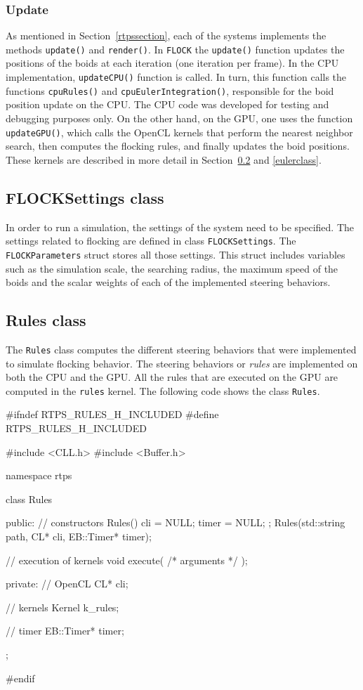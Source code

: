 \subsubsection{Update}
As mentioned in Section~\ref{rtpssection}, each of the systems implements the methods \texttt{update()} and \texttt{render()}. In \texttt{FLOCK} the \texttt{update()} function updates the positions of the boids at each iteration (one iteration per frame). In the CPU implementation, \texttt{updateCPU()} function is called. In turn, this function calls the functions \texttt{cpuRules()} and \texttt{cpuEulerIntegration()}, responsible for the boid position update on the CPU. The CPU code was developed for testing and debugging purposes only. On the other hand, on the GPU, one uses the function \texttt{updateGPU()}, which calls the OpenCL kernels that perform the nearest neighbor search, then computes the flocking rules, and finally updates the boid positions. These kernels are described in more detail in Section~\ref{rulesclass} and \ref{eulerclass}.

\subsection{FLOCKSettings class}
In order to run a simulation, the settings of the system need to be specified. The settings related to flocking are defined in class \texttt{FLOCKSettings}. The \texttt{FLOCKParameters} struct stores all those settings. This struct includes variables such as the simulation scale, the searching radius, the maximum speed of the boids and the scalar weights of each of the implemented steering behaviors. 

\subsection{Rules class}\label{rulesclass}
The \texttt{Rules} class computes the different steering behaviors that were implemented to simulate flocking behavior. The steering behaviors or \textit{rules} are implemented on both the CPU and the GPU. All the rules that are executed on the GPU are computed in the \texttt{rules} kernel. The following code shows the class \texttt{Rules}.

\begin{cppcode}{0}
#ifndef RTPS_RULES_H_INCLUDED
#define RTPS_RULES_H_INCLUDED

#include <CLL.h>
 #include <Buffer.h>

namespace rtps
 {
	class Rules
	{
		public:
			// constructors
			Rules() { cli = NULL; timer = NULL; };
			Rules(std::string path, CL* cli, EB::Timer* timer);
			
			// execution of kernels
			void execute( /* arguments */ );
			
		private:
			// OpenCL
			CL* cli;
			
			// kernels
			Kernel k_rules;
			
			// timer
			EB::Timer* timer;
	};
}
#endif
\end{cppcode}

